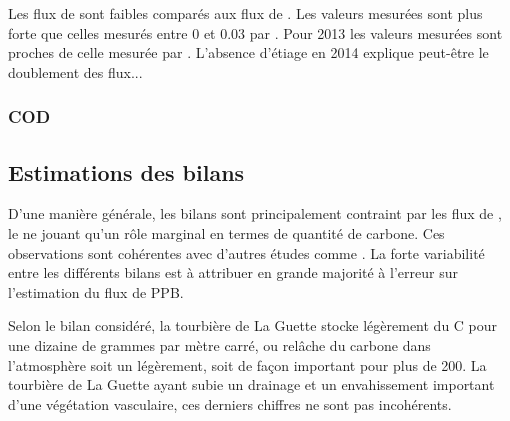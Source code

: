 
\subsubsection{\chh}
Les flux de \chh sont faibles comparés aux flux de \coo.
Les valeurs mesurées sont plus forte que celles mesurés entre \num{0} et \SI{0.03}{\uml} par \citet{bortoluzzi2006}.
Pour 2013 les valeurs mesurées sont proches de celle mesurée par \citet{long2010}.
L'absence d'étiage en 2014 explique peut-être le doublement des flux... \plop




\subsubsection{COD}

\subsection{Estimations des bilans}

D'une manière générale, les bilans sont principalement contraint par les flux de \coo, le \chh ne jouant qu'un rôle marginal en termes de quantité de carbone.
Ces observations sont cohérentes avec d'autres études comme \citet{bortoluzzi2006,worrall2009}.
La forte variabilité entre les différents bilans est à attribuer en grande majorité à l'erreur sur l'estimation du flux de PPB.

Selon le bilan considéré, la tourbière de La Guette stocke légèrement du C pour une dizaine de grammes par mètre carré, ou relâche du carbone dans l'atmosphère soit un légèrement, soit de façon important pour plus de \SI{200}{\gcma}.
La tourbière de La Guette ayant subie un drainage et un envahissement important d'une végétation vasculaire, ces derniers chiffres ne sont pas incohérents.






